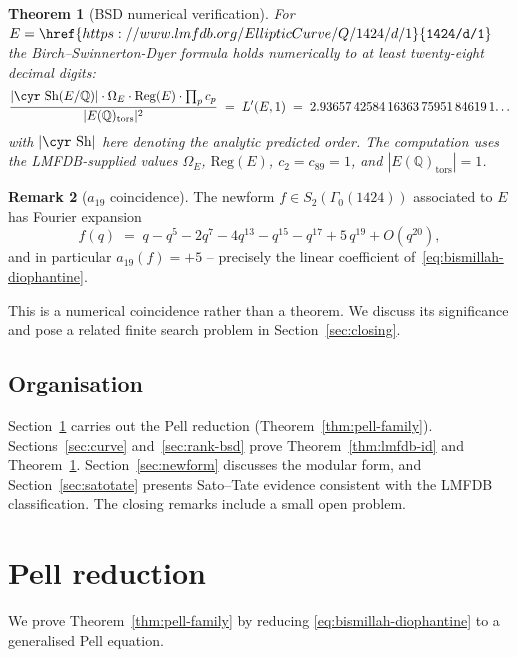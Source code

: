 \documentclass[11pt,a4paper]{article}
\theoremstyle{plain}
\newtheorem{theorem}{Theorem}
\theoremstyle{definition}
\newtheorem{remark}[theorem]{Remark}
\newcommand{\Q}{\mathbb{Q}}
\newcommand{\Sha}{\mbox{\cyr Sh}}
\newcommand{\Reg}{\mathrm{Reg}}
\newcommand{\LMFDB}[1]{\href{https://www.lmfdb.org/EllipticCurve/Q/#1}{\texttt{#1}}}
\begin{document}
\begin{theorem}[BSD numerical verification]\label{thm:bsd}
For $E = \LMFDB{1424/d/1}$ the Birch--Swinnerton-Dyer formula holds
numerically to at least twenty-eight decimal digits:
\begin{equation*}
  \frac{|\Sha(E/\Q)| \cdot \Omega_E \cdot \Reg(E) \cdot \prod_{p} c_p}
       {|E(\Q)_{\mathrm{tors}}|^2}
  \;=\; L'(E,1)
  \;=\; 2.93657\,42584\,16363\,75951\,84619\,1\!\ldots
\end{equation*}
with $|\Sha|$ here denoting the analytic predicted order. The
computation uses the LMFDB-supplied values $\Omega_E$, $\Reg(E)$,
$c_2 = c_{89} = 1$, and $|E(\Q)_{\mathrm{tors}}| = 1$.
\end{theorem}

\begin{remark}[$a_{19}$ coincidence]
The newform $f \in S_2(\Gamma_0(1424))$ associated to $E$ has Fourier
expansion
\begin{equation}
  \label{eq:newform-q}
  f(q) \;=\; q - q^5 - 2 q^7 - 4 q^{13} - q^{15} - q^{17} + 5\, q^{19} + O(q^{20}),
\end{equation}
and in particular $a_{19}(f) = +5$ -- precisely the linear coefficient
of~\eqref{eq:bismillah-diophantine}.

This is a numerical coincidence rather than a theorem.
We discuss its significance and pose a related finite search problem
in Section~\ref{sec:closing}.
\end{remark}

\subsection*{Organisation}
Section~\ref{sec:pell} carries out the Pell reduction
(Theorem~\ref{thm:pell-family}). Sections~\ref{sec:curve}
and~\ref{sec:rank-bsd} prove Theorem~\ref{thm:lmfdb-id} and
Theorem~\ref{thm:bsd}. Section~\ref{sec:newform} discusses the
modular form, and Section~\ref{sec:satotate} presents Sato--Tate
evidence consistent with the LMFDB classification. The closing
remarks include a small open problem.

\section{Pell reduction}
\label{sec:pell}

We prove Theorem~\ref{thm:pell-family} by reducing
\eqref{eq:bismillah-diophantine} to a generalised Pell equation.
\end{document}
